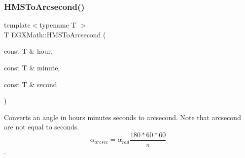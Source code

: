 \subsubsection{\texorpdfstring{H\+M\+S\+To\+Arcsecond()}{HMSToArcsecond()}}
{\footnotesize\ttfamily template$<$typename T $>$ \\
T E\+G\+X\+Math\+::\+H\+M\+S\+To\+Arcsecond (\begin{DoxyParamCaption}\item[{const T \&}]{hour,  }\item[{const T \&}]{minute,  }\item[{const T \&}]{second }\end{DoxyParamCaption})}



Converts an angle in hours minutes seconds to arcsecond. Note that arcsecond are not equal to seconds. \[\alpha_{arcsec}=\alpha_{rad}\frac{180 * 60 * 60}{\pi}\]. 

